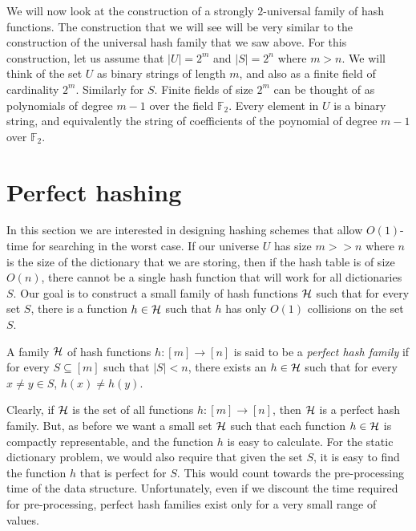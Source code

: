 We will now look at the construction of a strongly $2$-universal family of hash
functions.   The
construction that we will see will be very similar to the construction of the
universal hash family that we saw above. For this construction, let us assume
that $|U| = 2^m$ and $|S| = 2^n$ where $m>n$. We will think of the set $U$ as
binary strings of length $m$, and also as a finite field of cardinality
$2^m$. Similarly for $S$. Finite fields of size $2^m$ can be thought of as
polynomials of degree $m-1$ over the field $\mathbb{F}_2$. Every element in $U$
is a binary string, and equivalently the string of coefficients of the poynomial
of degree $m-1$ over $\mathbb{F}_2$.

\section{Perfect hashing}

In this section we are interested in designing hashing schemes that allow
$O(1)$-time for searching in the worst case. If our universe $U$ has size
$m >> n$ where $n$ is the size of the dictionary that we are storing, then if
the hash table is of size $O(n)$, there cannot be a single hash function that
will work for all dictionaries $S$. Our goal is to construct a small family of
hash functions ${\cal H}$ such that for every set $S$, there is a function
$h\in {\cal H}$ such that $h$ has only $O(1)$ collisions on the set $S$.

\begin{definition}
  A family ${\cal H}$ of hash functions $h:[m]\to [n]$ is said to be a
  \emph{perfect hash family} if for every $S\subseteq [m]$ such that $|S|<n$,
  there exists an $h\in{\cal H}$ such that for every $x\neq y \in S$,
  $h(x) \neq h(y)$.
  \label{defn:perfect-hash}
\end{definition}

Clearly, if ${\cal H}$ is the set of all functions $h:[m]\to [n]$, then
${\cal H}$ is a perfect hash family. But, as before we want a small set
${\cal H}$ such that each function $h\in {\cal H}$ is compactly representable,
and the function $h$ is easy to calculate. For the static dictionary problem, we
would also require that given the set $S$, it is easy to find the function $h$
that is perfect for $S$. This would count towards the pre-processing time of the
data structure. Unfortunately, even if we discount the time required for
pre-processing, perfect hash families exist only for a very small range of
values.

